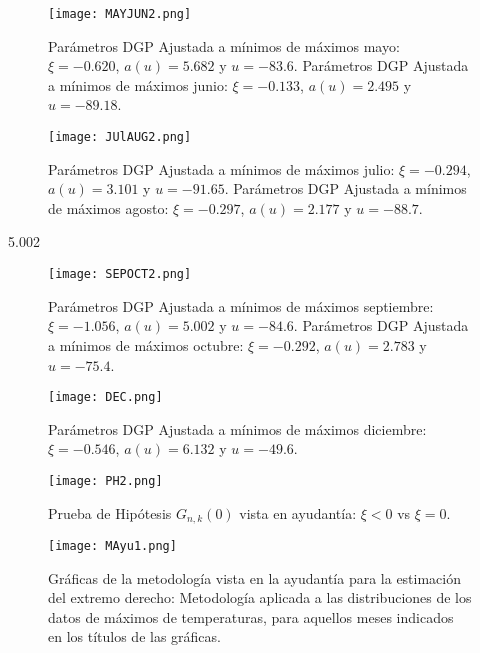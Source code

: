 \documentclass[10.5pt,notitlepage]{article}
\theoremstyle{plain}
\begin{document}
\begin{figure}[htb]
    \centering
    \texttt{[image: MAYJUN2.png]}
    \caption{Parámetros DGP Ajustada a mínimos de máximos mayo: \(\xi =-0.620\), \(a(u)=5.682\) y \(u = -83.6\). Parámetros DGP Ajustada a mínimos de máximos junio: \(\xi =-0.133\), \(a(u)=2.495\) y \(u = -89.18\).}
    \label{fig:2/9}  
\end{figure} 


\begin{figure}[htb]
    \centering
    \texttt{[image: JUlAUG2.png]}
    \caption{Parámetros DGP Ajustada a mínimos de máximos julio: \(\xi = -0.294\), \(a(u)=3.101 \) y \(u =-91.65\). Parámetros DGP Ajustada a mínimos de máximos agosto: \(\xi = -0.297\), \(a(u)=2.177\) y \(u =  -88.7\).}
    \label{fig:2/10}    
\end{figure} 

5.002 
\begin{figure}[htb]
    \centering
    \texttt{[image: SEPOCT2.png]}
    \caption{Parámetros DGP Ajustada a mínimos de máximos septiembre: \(\xi =  -1.056\), \(a(u)= 5.002 \) y \(u =-84.6\). Parámetros DGP Ajustada a mínimos de máximos octubre: \(\xi = -0.292\), \(a(u)=2.783 \) y \(u = -75.4\).}
    \label{fig:2/11}
\end{figure} 


\begin{figure}[htb]
    \centering
    \texttt{[image: DEC.png]}
    \caption{Parámetros DGP Ajustada a mínimos de máximos diciembre: \(\xi =-0.546\), \(a(u)=6.132\) y \(u =-49.6\).}
    \label{fig:2/12}
\end{figure}


\begin{figure}[htb]
    \centering
    \texttt{[image: PH2.png]}
    \caption{Prueba de Hipótesis \(G_{n,k}(0)\) vista en ayudantía: \(\xi <0\) vs \(\xi = 0\).}
    \label{fig:2/13}
\end{figure}


\begin{figure}[htb]
    \centering
    \texttt{[image: MAyu1.png]}
    \caption{Gráficas de la metodología vista en la ayudantía para la estimación del extremo derecho: Metodología aplicada a las distribuciones de los datos de máximos de temperaturas, para aquellos meses indicados en los títulos de las gráficas. }
    \label{fig:20}
\end{figure}
\end{document}
